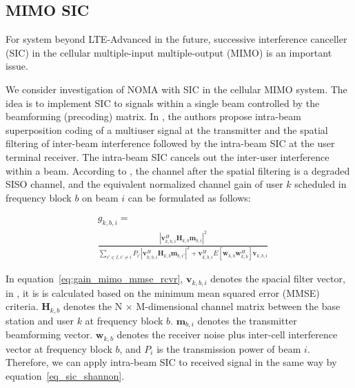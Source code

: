 \subsection{MIMO SIC}
For system beyond LTE-Advanced in the future, successive
interference canceller (SIC) in the cellular multiple-input
multiple-output (MIMO) is an important issue.

We consider investigation of NOMA with SIC in the cellular MIMO system.
The idea is to implement SIC to signals within
a single beam controlled by the beamforming (precoding) matrix.
In \cite{Non-orthogonal_Access_with_Random_Beamforming_and_Intra-beam_SIC_for_Cellular_MIMO_Downlink},
the authors propose intra-beam superposition coding of a multiuser signal at
the transmitter and the spatial filtering of inter-beam
interference followed by the intra-beam SIC at the user terminal
receiver. The intra-beam SIC cancels out the inter-user
interference within a beam.
According to \cite{Non-orthogonal_Access_with_Random_Beamforming_and_Intra-beam_SIC_for_Cellular_MIMO_Downlink},
the channel after the spatial filtering is a degraded SISO
channel, and the equivalent normalized channel gain of user
$k$ scheduled in frequency block $b$ on beam $i$
can be formulated as follows:

\begin{equation}
\label{eq:gain_mimo_mmse_rcvr}
\begin{split}
&g_{k,b,i}= \\
&\frac{|\mathbf{v}^H_{k,b,i} \mathbf{H}_{k,b} \mathbf{m}_{b,i}|^2}{\underset{i'\in I, i'\neq i}{\sum} P_{i'}|\mathbf{v}^H_{k,b,i} \mathbf{H}_{k,b} \mathbf{m}_{b,i'}|^2 + \mathbf{v}^{H}_{k,b,i} E[\mathbf{w}_{k,b} \mathbf{w}^{H}_{k,b}] \mathbf{v}_{k,b,i}}
\end{split}
\end{equation}

In equation~\ref{eq:gain_mimo_mmse_rcvr}, 
$\mathbf{v}_{k,b,i}$ denotes the spacial filter vector, in \cite{Non-orthogonal_Access_with_Random_Beamforming_and_Intra-beam_SIC_for_Cellular_MIMO_Downlink},
it is is calculated based on the minimum mean squared error
(MMSE) criteria.
$\mathbf{H}_{k,b}$ denotes the N $\times$ M-dimensional channel matrix between
the base station and user $k$ at frequency block $b$.
$\mathbf{m}_{b,i}$ denotes the transmitter beamforming vector.
$\mathbf{w}_{k,b}$ denotes the receiver noise plus inter-cell interference
vector at frequency block $b$,
and $P_{i}$ is the transmission power of beam $i$.
Therefore, we can apply intra-beam SIC to received signal in the
same way by equation~\ref{eq_sic_shannon}.



